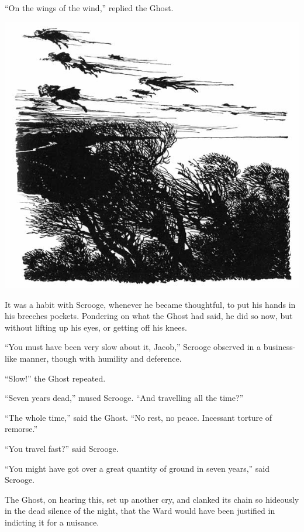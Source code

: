 \documentclass[paper=5.5in:8.5in,BCOR=10mm,twoside,DIV=15,12pt,usegeometry,openany]{scrbook} %
\begin{document}
\enquote{On the wings of the wind,} replied the Ghost. 
 \begin{center}
     \vfill%
     \includegraphics[width=\columnwidth]{gs045b}
 \end{center}
\clearpage

It was a habit with Scrooge, whenever he became thoughtful, to put his hands in his breeches pockets. Pondering on what the Ghost had said, he did so now, but without lifting up his eyes, or getting off his knees.

\enquote{You must have been very slow about it, Jacob,} Scrooge observed in a business-like manner, though with humility and deference.

\enquote{Slow!} the Ghost repeated.

\enquote{Seven years dead,} mused Scrooge. \enquote{And travelling all the time?}

\enquote{The whole time,} said the Ghost. \enquote{No rest, no peace. Incessant torture of remorse.}

\enquote{You travel fast?} said Scrooge.



\enquote{You might have got over a great quantity of ground in seven years,} said Scrooge.

The Ghost, on hearing this, set up another cry, and clanked its chain so hideously in the dead silence of the night, that the Ward would have been justified in indicting it for a nuisance.
\end{document}
